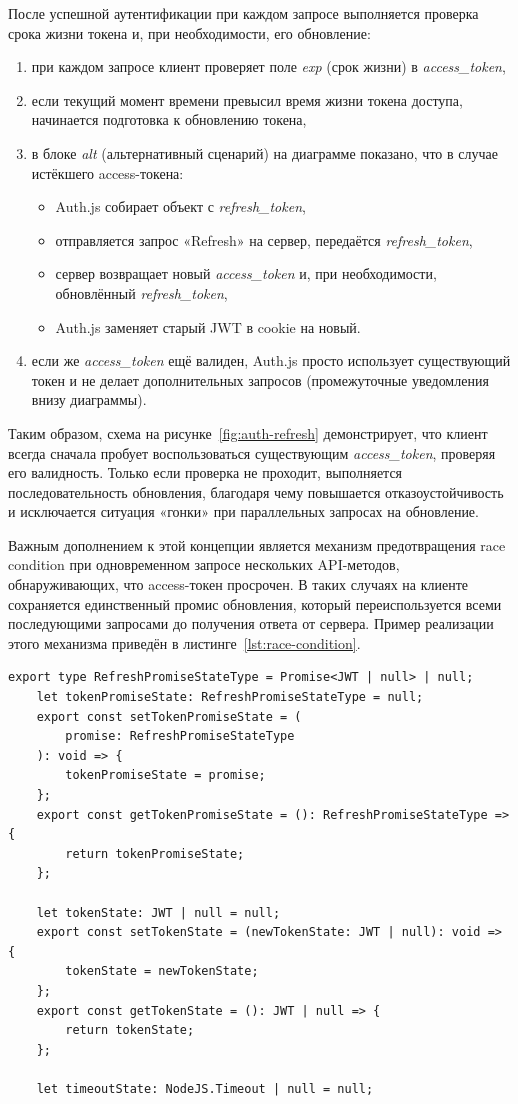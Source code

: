После успешной аутентификации при каждом запросе выполняется проверка срока жизни токена и, при необходимости, его обновление:
\begin{enumerate}
    \item при каждом запросе клиент проверяет поле \textit{exp} (срок жизни) в \textit{access\_token},
    \item если текущий момент времени превысил время жизни токена доступа, начинается подготовка к обновлению токена,
    \item в блоке \textit{alt} (альтернативный сценарий) на диаграмме показано, что в случае истёкшего access-токена:
    \begin{itemize}
        \item Auth.js собирает объект с \textit{refresh\_token},
        \item отправляется запрос «Refresh» на сервер, передаётся \textit{refresh\_token},
        \item сервер возвращает новый \textit{access\_token} и, при необходимости, обновлённый \textit{refresh\_token},
        \item Auth.js заменяет старый JWT в cookie на новый.
    \end{itemize}
    \item если же \textit{access\_token} ещё валиден, Auth.js просто использует существующий токен и не делает дополнительных запросов (промежуточные уведомления внизу диаграммы).
\end{enumerate}

Таким образом, схема на рисунке~\ref{fig:auth-refresh} демонстрирует, что клиент всегда сначала пробует воспользоваться существующим \textit{access\_token}, проверяя его валидность. Только если проверка не проходит, выполняется последовательность обновления, благодаря чему повышается отказоустойчивость и исключается ситуация «гонки» при параллельных запросах на обновление.

Важным дополнением к этой концепции является механизм предотвращения race condition при одновременном запросе нескольких API-методов, обнаруживающих, что access-токен просрочен. В таких случаях на клиенте сохраняется единственный промис обновления, который переиспользуется всеми последующими запросами до получения ответа от сервера. Пример реализации этого механизма приведён в листинге~\ref{lst:race-condition}.

\begin{lstlisting}[caption={Механизм предотвращения race condition при рефреше токена}, label={lst:race-condition}]
	export type RefreshPromiseStateType = Promise<JWT | null> | null;
	let tokenPromiseState: RefreshPromiseStateType = null;
	export const setTokenPromiseState = (
		promise: RefreshPromiseStateType
	): void => {
		tokenPromiseState = promise;
	};
	export const getTokenPromiseState = (): RefreshPromiseStateType => {
		return tokenPromiseState;
	};

	let tokenState: JWT | null = null;
	export const setTokenState = (newTokenState: JWT | null): void => {
		tokenState = newTokenState;
	};
	export const getTokenState = (): JWT | null => {
		return tokenState;
	};

	let timeoutState: NodeJS.Timeout | null = null;
\end{lstlisting}

